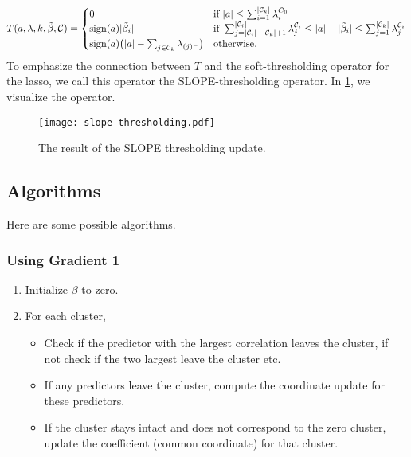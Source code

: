 \begin{equation}
  \label{eq:slope-thresholding}
  T(a, \lambda,k,\tilde \beta, \mathcal{C}) =
  \begin{cases}
    0                                                        & \text{if } |a| \leq \sum_{i=1}^{|\mathcal{C}_k|}\lambda^{C_0}_i                                                                                                                      \\
    \operatorname{sign}(a)|\tilde \beta_i|                                              & \text{if } \sum_{j= |\mathcal{C}_i| - |\mathcal{C}_k| + 1}^{|\mathcal{C}_i|} \lambda^{\mathcal{C}_i}_j \leq |a| - |\tilde \beta_i| \leq \sum_{j=1}^{|\mathcal{C}_k|}\lambda^{\mathcal{C}_i}_j \\
    \operatorname{sign}(a)\big(|a| - \sum_{j \in \mathcal{C}_k}\lambda_{(j)^-}\big) & \text{otherwise.
    }
  \end{cases}
\end{equation}
To emphasize the connection between \(T\) and the soft-thresholding operator
for the lasso, we call this operator the SLOPE-thresholding operator.
In \cref{fig:slope-thresholding}, we visualize the operator.

\begin{figure}[htbp]
  \centering
  \texttt{[image: slope-thresholding.pdf]}
  \caption{The result of the SLOPE thresholding update.}
  \label{fig:slope-thresholding}
\end{figure}

\subsection{Algorithms}

Here are some possible algorithms.

\subsubsection{Using Gradient 1}

\begin{enumerate}
  \item Initialize \(\beta\) to zero.
  \item For each cluster,
        \begin{itemize}
          \item Check if the predictor with the largest correlation leaves the
                cluster, if not check if the two largest leave the cluster etc.
          \item If any predictors leave the cluster, compute the coordinate
                update for these predictors.
          \item If the cluster stays intact and does not correspond to the
                zero cluster, update the coefficient (common coordinate) for that
                cluster.
        \end{itemize}
\end{enumerate}

